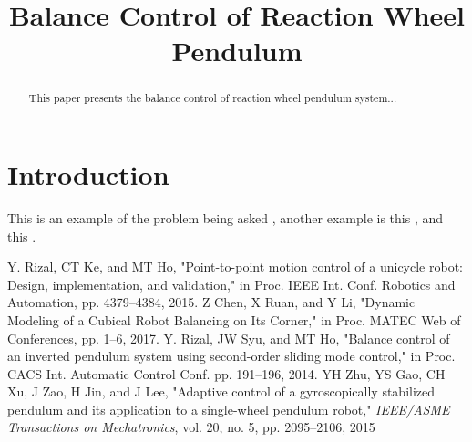 \documentclass[conference]{IEEEtran}
\begin{document}
\title{Balance Control of Reaction Wheel Pendulum}

\maketitle

\begin{abstract}
This paper presents the balance control of reaction wheel pendulum system...
\end{abstract}

\IEEEpeerreviewmaketitle

\section{Introduction}
This is an example of the problem being asked \cite{rizal2015point,chen2017dynamic,rizal2014balance}, another example is this \cite{zhu2015adaptive,chen2017dynamic}, and this \cite{chen2017dynamic}.



\begin{thebibliography}{1}

Y. Rizal, CT Ke, and MT Ho, "Point-to-point motion control of a unicycle robot: Design, implementation, and validation," in Proc. IEEE Int. Conf. Robotics and Automation, pp. 4379--4384, 2015.
Z Chen, X Ruan, and Y Li, "Dynamic Modeling of a Cubical Robot Balancing on Its Corner," in Proc. MATEC Web of Conferences, pp. 1--6, 2017.
Y. Rizal, JW Syu, and MT Ho, "Balance control of an inverted pendulum system using second-order sliding mode control," in Proc. CACS Int. Automatic Control Conf. pp. 191--196, 2014.
YH Zhu, YS Gao, CH Xu, J Zao, H Jin, and J Lee, "Adaptive control of a gyroscopically stabilized pendulum and its application to a single-wheel pendulum robot," \emph{IEEE/ASME Transactions on Mechatronics}, vol. 20, no. 5, pp. 2095--2106, 2015
\end{thebibliography}
\end{document}
